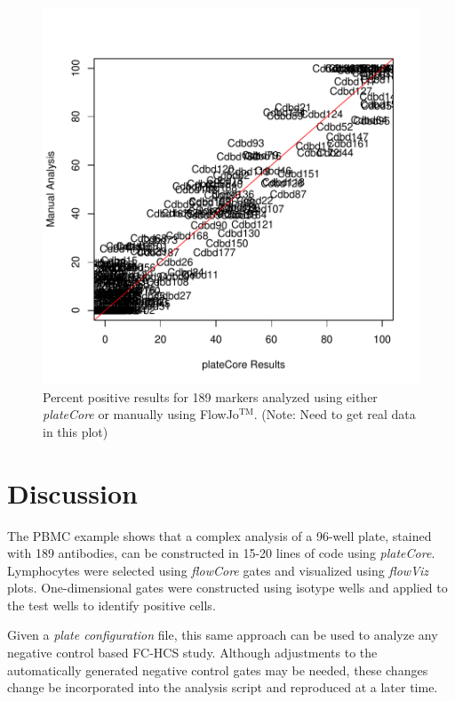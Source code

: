 \documentclass[12pt]{article}
\newcommand{\Rpackage}[1]{{\textit{#1}}}
\begin{document}
\begin{figure}
\centering
\includegraphics{outline-pcVSman}
\caption{Percent positive results for 189 markers analyzed using either \Rpackage{plateCore} or manually using FlowJo$^{\text{TM}}$. (Note: Need to get real
data in this plot)}
\label{fig:pcVSman}
\end{figure}

\clearpage
\section*{Discussion}

The PBMC example shows that a complex analysis of a 96-well plate, stained with 189 antibodies,
can be constructed in 15-20 lines of code using \Rpackage{plateCore}. Lymphocytes were selected
using \Rpackage{flowCore} gates and visualized using \Rpackage{flowViz} plots. One-dimensional 
gates were constructed using isotype wells and applied to the test wells to identify positive cells.

Given a \textit{plate configuration} file, this same approach can be used to analyze any
negative control based FC-HCS study. Although adjustments to the automatically generated negative control gates may be needed,
these changes change be incorporated into the analysis script and reproduced at a later time.
\end{document}
